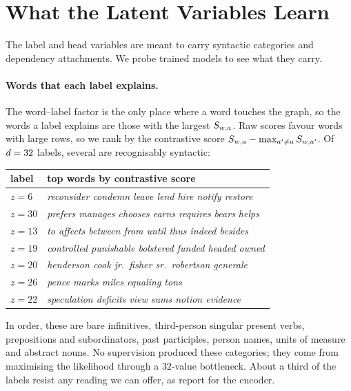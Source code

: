 \section{What the Latent Variables Learn}
\label{app:interpretability}

The label and head variables are meant to carry syntactic categories and dependency
attachments. We probe trained models to see what they carry.

\paragraph{Words that each label explains.}
The word--label factor is the only place where a word touches the graph, so the words a label
explains are those with the largest $S_{w,a}$. Raw scores favour words with large rows, so
we rank by the contrastive score $S_{w,a} - \max_{a' \neq a}S_{w,a'}$. Of $d = 32$
labels, several are recognisably syntactic:

\begin{center}\scriptsize
\begin{tabular}{@{}ll@{}}
\toprule
label & top words by contrastive score \\
\midrule
$z{=}6$  & \textit{reconsider condemn leave lend hire notify restore} \\
$z{=}30$ & \textit{prefers manages chooses earns requires bears helps} \\
$z{=}13$ & \textit{to affects between from until thus indeed besides} \\
$z{=}19$ & \textit{controlled punishable bolstered funded headed owned} \\
$z{=}20$ & \textit{henderson cook jr.\ fisher sr.\ robertson generale} \\
$z{=}26$ & \textit{pence marks miles equaling tons} \\
$z{=}22$ & \textit{speculation deficits view sums notion evidence} \\
\bottomrule
\end{tabular}
\end{center}

\noindent
In order, these are bare infinitives, third-person singular present verbs, prepositions and
subordinators, past participles, person names, units of measure and abstract nouns. No
supervision produced these categories; they come from maximising the likelihood through a
$32$-value bottleneck. About a third of the labels resist any reading we can offer, as
\citet{wu2023probabilistic} report for the encoder.

